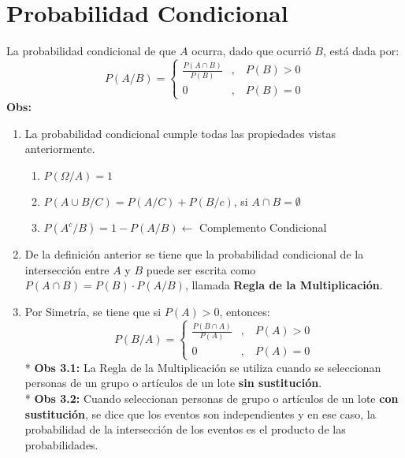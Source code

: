 \documentclass{templateNote}
\begin{document}
\section{Probabilidad Condicional}
La probabilidad condicional de que $A$ ocurra, dado que ocurrió $B$, está dada por:
\begin{equation*}
    P(A / B) = \left\{ \begin{array}{ll}\frac{P(A \cap B)}{P(B)} & \text{,} \quad P(B) > 0 \\ 0 & \text{,} \quad P(B) = 0\end{array}\right.
\end{equation*}
\textbf{Obs:}
\begin{enumerate}
    \item La probabilidad condicional cumple todas las propiedades vistas anteriormente.
    \begin{enumerate}
        \item $P(\Omega/A) = 1$
        \item $P(A \cup B / C) = P(A/C) + P(B/c)$, si $A \cap B = \emptyset$
        \item $P(A^c/B) = 1 - P(A/B) \leftarrow$ Complemento Condicional
    \end{enumerate}
    
    \item De la definición anterior se tiene que la probabilidad condicional de la
    intersección entre $A$ y $B$ puede ser escrita como $P(A \cap B) = P(B) \cdot P(A/B)$, llamada
    \textbf{Regla de la Multiplicación}.
    
    \item Por Simetría, se tiene que si $P(A) > 0$, entonces:
    \begin{equation*}
        P(B / A) = \left\{ \begin{array}{ll}\frac{P(B \cap A)}{P(A)} & \text{,} \quad P(A) > 0 \\ 0 & \text{,} \quad P(A) = 0\end{array}\right.
    \end{equation*}
    * \textbf{Obs 3.1:} La Regla de la Multiplicación se utiliza cuando se seleccionan personas
    de un grupo o artículos de un lote \textbf{sin sustitución}. \\
    * \textbf{Obs 3.2:} Cuando seleccionan personas de grupo o artículos de un lote \textbf{con
    sustitución}, se dice que los eventos son independientes y en ese caso, la probabilidad
    de la intersección de los eventos es el producto de las probabilidades.
    

\end{enumerate}
\end{document}
